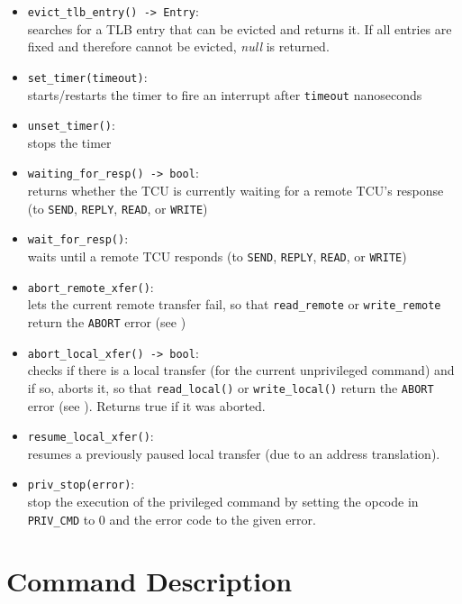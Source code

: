 \begin{itemize}
  \item \texttt{evict\_tlb\_entry() -> Entry}: \\
  searches for a TLB entry that can be evicted and returns it. If all entries are fixed and
  therefore cannot be evicted, \emph{null} is returned.\extend{}
  \item \texttt{set\_timer(timeout)}: \\
  starts/restarts the timer to fire an interrupt after \texttt{timeout} nanoseconds
  \item \texttt{unset\_timer()}:\\
  stops the timer
  \item \texttt{waiting\_for\_resp() -> bool}:\\
  returns whether the TCU is currently waiting for a remote TCU's response (to \texttt{SEND},
  \texttt{REPLY}, \texttt{READ}, or \texttt{WRITE})
  \item \texttt{wait\_for\_resp()}:\\
  waits until a remote TCU responds (to \texttt{SEND}, \texttt{REPLY}, \texttt{READ}, or
  \texttt{WRITE})
  \item \texttt{abort\_remote\_xfer()}:\\
  lets the current remote transfer fail, so that \texttt{read\_remote} or \texttt{write\_remote}
  return the \texttt{ABORT} error (see )
  \item \texttt{abort\_local\_xfer() -> bool}:\\
  checks if there is a local transfer (for the current unprivileged command) and if so, aborts it,
  so that \texttt{read\_local()} or \texttt{write\_local()} return the \texttt{ABORT} error (see
  ). Returns true if it was aborted.
  \item \texttt{resume\_local\_xfer()}:\\
  resumes a previously paused local transfer (due to an address translation). \extend{}
  \item \texttt{priv\_stop(error)}: \\
  stop the execution of the privileged command by setting the opcode in \texttt{PRIV\_CMD} to 0 and
  the error code to the given error. \extend{}
\end{itemize}

\section{Command Description}

